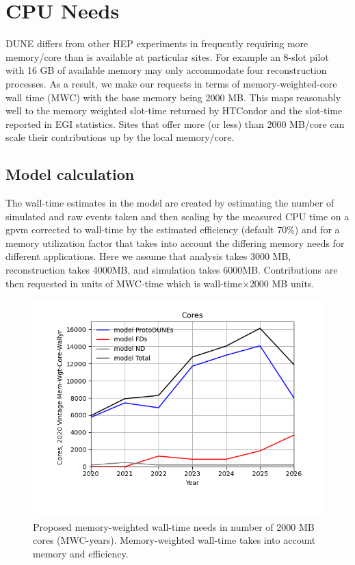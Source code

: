 \documentclass[12pt]{article}
\begin{document}
\clearpage
\section{CPU Needs}

DUNE differs from other HEP experiments in frequently requiring more memory/core than is available at particular sites.  For example an 8-slot pilot with 16 GB of available memory may only accommodate four reconstruction processes.   As a result, we make our requests in terms of memory-weighted-core wall time (MWC)  with the base memory being 2000 MB. This maps reasonably well to the memory weighted slot-time returned by HTCondor and the slot-time reported in EGI statistics.  Sites that offer more  (or less) than 2000 MB/core can scale their contributions up by the local memory/core.

\subsection{Model calculation}
The wall-time estimates in the model are created by estimating the number of simulated and raw events taken and then scaling by the measured CPU time on a gpvm corrected to wall-time by the estimated efficiency (default 70\%) and for a memory utilization factor that takes into account the differing memory needs for different applications. Here we assume that analysis takes 3000 MB, reconstruction takes 4000MB, and simulation takes 6000MB.  Contributions are then requested in units of MWC-time which is wall-time$\times$2000 MB units. 


\begin{figure}[h]
\centering\includegraphics[height=0.4\textwidth]{MoreSim_2022-11-21-2026/MoreSim_2022-11-21-2026-Cores.png}
\caption{Proposed memory-weighted wall-time needs in number of 2000 MB cores (MWC-years). Memory-weighted  wall-time takes into account memory and efficiency.}\label{fig:CoresMain}
\end{figure}
\end{document}
